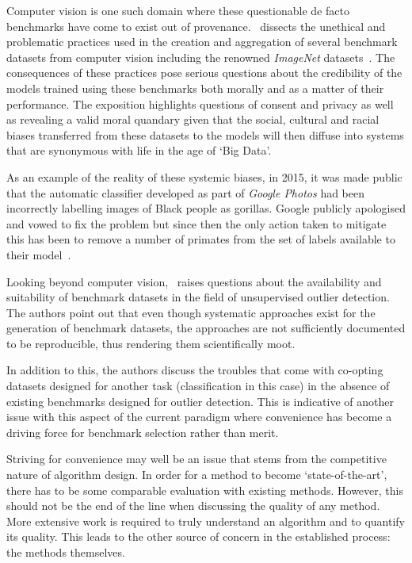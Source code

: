 Computer vision is one such domain where these questionable de facto benchmarks
have come to exist out of provenance.~\cite{Prabhu2020} dissects the unethical
and problematic practices used in the creation and aggregation of several
benchmark datasets from computer vision including the renowned \emph{ImageNet}
datasets~\cite{Deng2009}. The consequences of these practices pose serious
questions about the credibility of the models trained using these benchmarks
both morally and as a matter of their performance. The exposition highlights
questions of consent and privacy as well as revealing a valid moral quandary
given that the social, cultural and racial biases transferred from these
datasets to the models will then diffuse into systems that are synonymous with
life in the age of `Big Data'.

As an example of the reality of these systemic biases, in 2015, it was made
public that the automatic classifier developed as part of \emph{Google Photos}
had been incorrectly labelling images of Black people as gorillas. Google
publicly apologised and vowed to fix the problem but since then the only action
taken to mitigate this has been to remove a number of primates from the set of
labels available to their model~\cite{Simonite2018}.

Looking beyond computer vision,~\cite{Campos2016} raises questions about the
availability and suitability of benchmark datasets in the field of unsupervised
outlier detection. The authors point out that even though systematic approaches
exist for the generation of benchmark datasets, the approaches are not
sufficiently documented to be reproducible, thus rendering them scientifically
moot.

In addition to this, the authors discuss the troubles that come with
co-opting datasets designed for another task (classification in this case) in
the absence of existing benchmarks designed for outlier detection. This is
indicative of another issue with this aspect of the current paradigm where
convenience has become a driving force for benchmark selection rather than
merit.

Striving for convenience may well be an issue that stems from the competitive
nature of algorithm design. In order for a method to become `state-of-the-art',
there has to be some comparable evaluation with existing methods. However, this
should not be the end of the line when discussing the quality of any method.
More extensive work is required to truly understand an algorithm and to quantify
its quality. This leads to the other source of concern in the established
process: the methods themselves.

